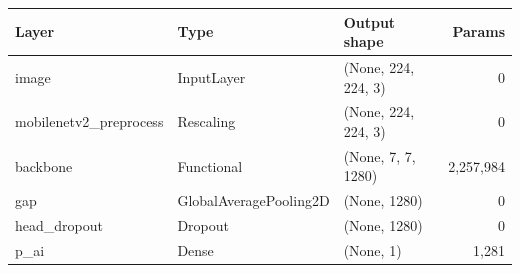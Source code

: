 \begin{tabular}{lllr}
\toprule
\textbf{Layer} & \textbf{Type} & \textbf{Output shape} & \textbf{Params} \\
\midrule
image & InputLayer & (None, 224, 224, 3) & 0 \\
mobilenetv2\_preprocess & Rescaling & (None, 224, 224, 3) & 0 \\
backbone & Functional & (None, 7, 7, 1280) & 2,257,984 \\
gap & GlobalAveragePooling2D & (None, 1280) & 0 \\
head\_dropout & Dropout & (None, 1280) & 0 \\
p\_ai & Dense & (None, 1) & 1,281 \\
\bottomrule
\end{tabular}
